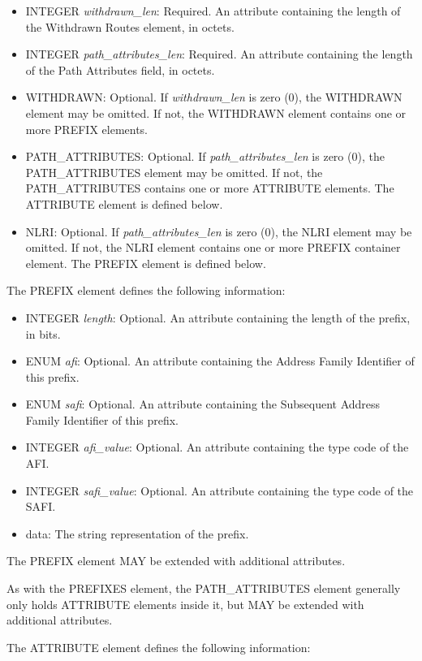 \documentclass{article}
\begin{document}
\begin{itemize}
\item{INTEGER \emph{withdrawn_len}: Required. An attribute containing the length of the Withdrawn Routes element, in octets.}
\item{INTEGER \emph{path_attributes_len}: Required. An attribute containing the length of the Path Attributes field, in octets.}
\item{WITHDRAWN: Optional. If \emph{withdrawn_len} is zero (0), the WITHDRAWN element may be omitted.  If not, the WITHDRAWN element contains one or more PREFIX elements.}
\item{PATH_ATTRIBUTES: Optional. If \emph{path_attributes_len} is zero (0), the PATH_ATTRIBUTES element may be omitted.  If not, the PATH_ATTRIBUTES contains one or more ATTRIBUTE elements.  The ATTRIBUTE element is defined below.}
\item{NLRI: Optional. If \emph{path_attributes_len} is zero (0), the NLRI element may be omitted.  If not, the NLRI element contains one or more PREFIX container element.  The PREFIX element is defined below.}
\end{itemize}

The PREFIX element defines the following information:

\begin{itemize}
\item{INTEGER \emph{length}: Optional. An attribute containing the length of the prefix, in bits.}
\item{ENUM \emph{afi}: Optional. An attribute containing the Address Family Identifier of this prefix.}
\item{ENUM \emph{safi}: Optional. An attribute containing the Subsequent Address Family Identifier of this prefix.}
\item{INTEGER \emph{afi_value}: Optional. An attribute containing the type code of the AFI.}
\item{INTEGER \emph{safi_value}: Optional. An attribute containing the type code of the SAFI.}
\item{data: The string representation of the prefix.}
\end{itemize}

The PREFIX element MAY be extended with additional attributes.

As with the PREFIXES element, the PATH_ATTRIBUTES element generally only holds ATTRIBUTE elements inside it, but MAY be extended with additional attributes.

The ATTRIBUTE element defines the following information:
\end{document}
